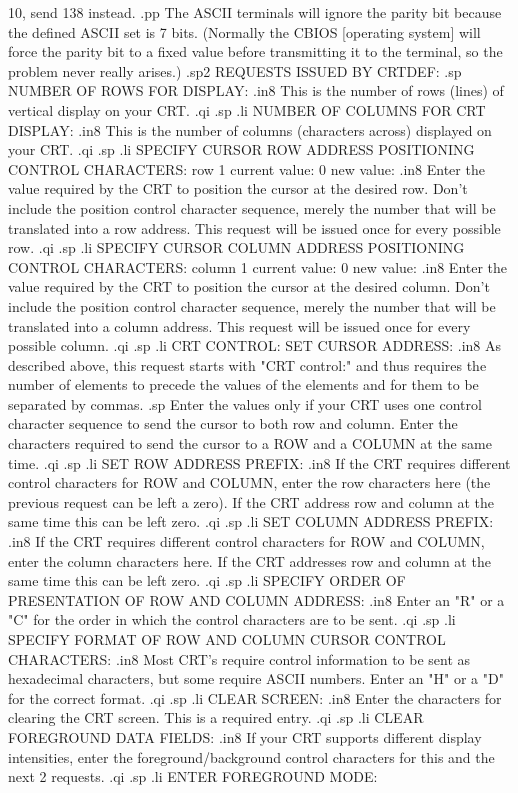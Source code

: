 10, send 138 instead.
.pp
The ASCII terminals will ignore the parity bit because the defined
ASCII set is 7 bits.  (Normally the CBIOS [operating system] will force
the parity bit to a fixed value before transmitting it to the terminal,
so the problem never really arises.)
.sp2
REQUESTS ISSUED BY CRTDEF:
.sp
NUMBER OF ROWS FOR DISPLAY:
.in8
This is the number of rows (lines) of vertical display on your CRT.
.qi
.sp
.li
NUMBER OF COLUMNS FOR CRT DISPLAY:
.in8
This is the number of columns (characters across) displayed on your CRT.
.qi
.sp
.li
SPECIFY CURSOR ROW ADDRESS POSITIONING CONTROL CHARACTERS:
	row 1  current value:  0
		   new value:
.in8
Enter the value required by the CRT to position the cursor at the desired row.
Don't include the position control character sequence, merely the number
that will be translated into a row address.  This request will be issued
once for every possible row.
.qi
.sp
.li
SPECIFY CURSOR COLUMN ADDRESS POSITIONING CONTROL CHARACTERS:
	column 1   current value:  0
		       new value:
.in8
Enter the value required by the CRT to position the cursor at the desired
column.  Don't include the position control character sequence, merely the
number that will be translated into a column address.  This request will
be issued once for every possible column.
.qi
.sp
.li
CRT CONTROL:  SET CURSOR ADDRESS:
.in8
As described above, this request starts with "CRT control:" and thus requires
the number of elements to precede the values of the elements and for them to
be separated by commas.
.sp
Enter the values only if your CRT uses one control character sequence to send
the cursor to both row and column.  Enter the characters required to send the
cursor to a ROW and a COLUMN at the same time.
.qi
.sp
.li
SET ROW ADDRESS PREFIX:
.in8
If the CRT requires different control characters for ROW and COLUMN, enter
the row characters here (the previous request can be left a zero).  If the
CRT address row and column at the same time this can be left zero.
.qi
.sp
.li
SET COLUMN ADDRESS PREFIX:
.in8
If the CRT requires different control characters for ROW and COLUMN, enter
the column characters here.  If the CRT addresses row and column at the same
time this can be left zero.
.qi
.sp
.li
SPECIFY ORDER OF PRESENTATION OF ROW AND COLUMN ADDRESS:
.in8
Enter an "R" or a "C" for the order in which the control characters are to
be sent.
.qi
.sp
.li
SPECIFY FORMAT OF ROW AND COLUMN CURSOR CONTROL CHARACTERS:
.in8
Most CRT's require control information to be sent as hexadecimal characters,
but some require ASCII numbers.  Enter an "H" or a "D" for the correct format.
.qi
.sp
.li
CLEAR SCREEN:
.in8
Enter the characters for clearing the CRT screen.  This is a required entry.
.qi
.sp
.li
CLEAR FOREGROUND DATA FIELDS:
.in8
If your CRT supports different display intensities, enter the
foreground/background
control characters for this and the next 2 requests.
.qi
.sp
.li
ENTER FOREGROUND MODE:

